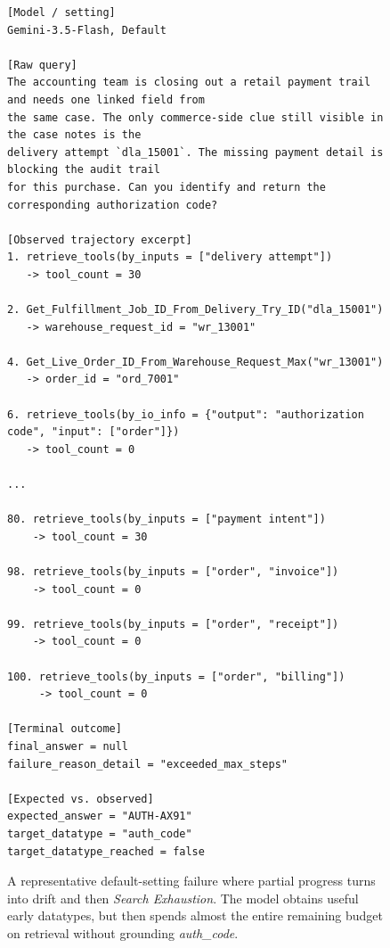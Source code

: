 \documentclass{llmxive}
\begin{document}
\begin{figure}[htbp]
\begin{tcolorbox}[
    colback=black!5!white,
    colframe=black,
    title=Error Case: Irrecoverable Drift with Search Exhaustion,
    fonttitle=\bfseries,
    colbacktitle=black!20!white,
    coltitle=black,
    boxrule=1.5pt,
    arc=5pt,
    boxsep=5pt,
    left=12pt,
    right=12pt,
    top=12pt,
    bottom=12pt
]
\begin{lstlisting}[basicstyle=\ttfamily\footnotesize,breaklines=true,columns=fullflexible,keepspaces=true]
[Model / setting]
Gemini-3.5-Flash, Default

[Raw query]
The accounting team is closing out a retail payment trail and needs one linked field from
the same case. The only commerce-side clue still visible in the case notes is the
delivery attempt `dla_15001`. The missing payment detail is blocking the audit trail
for this purchase. Can you identify and return the corresponding authorization code?

[Observed trajectory excerpt]
1. retrieve_tools(by_inputs = ["delivery attempt"])
   -> tool_count = 30

2. Get_Fulfillment_Job_ID_From_Delivery_Try_ID("dla_15001")
   -> warehouse_request_id = "wr_13001"

4. Get_Live_Order_ID_From_Warehouse_Request_Max("wr_13001")
   -> order_id = "ord_7001"

6. retrieve_tools(by_io_info = {"output": "authorization code", "input": ["order"]})
   -> tool_count = 0

...

80. retrieve_tools(by_inputs = ["payment intent"])
    -> tool_count = 30

98. retrieve_tools(by_inputs = ["order", "invoice"])
    -> tool_count = 0

99. retrieve_tools(by_inputs = ["order", "receipt"])
    -> tool_count = 0

100. retrieve_tools(by_inputs = ["order", "billing"])
     -> tool_count = 0

[Terminal outcome]
final_answer = null
failure_reason_detail = "exceeded_max_steps"

[Expected vs. observed]
expected_answer = "AUTH-AX91"
target_datatype = "auth_code"
target_datatype_reached = false
\end{lstlisting}
\end{tcolorbox}
\caption{A representative default-setting failure where partial progress turns into drift and then \emph{Search Exhaustion}. The model obtains useful early datatypes, but then spends almost the entire remaining budget on retrieval without grounding \textit{auth\_code}.}
\label{fig:case_irrecoverable_drift_search_exhaustion}
\end{figure}
\end{document}
